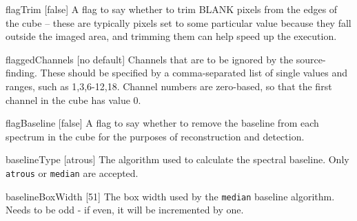 \begin{Lentry}
\item[{flagTrim [false]}] A flag to say whether to trim
  BLANK pixels from the edges of the cube -- these are typically
  pixels set to some particular value because they fall outside the
  imaged area, and trimming them can help speed up the execution.
\item[{flaggedChannels [no default]}] Channels that are to be ignored
  by the source-finding. These should be specified by a
  comma-separated list of single values and ranges, such as
  1,3,6-12,18. Channel numbers are zero-based, so that the first
  channel in the cube has value 0.
\item[{flagBaseline [false]}] A flag to say whether to remove
  the baseline from each spectrum in the cube for the purposes of
  reconstruction and detection.
\item[{baselineType [atrous]}] The algorithm used to calculate the
  spectral baseline. Only \texttt{atrous} or \texttt{median} are
  accepted.
\item[{baselineBoxWidth [51]}] The box width used by the
  \texttt{median} baseline algorithm. Needs to be odd - if even, it
  will be incremented by one.
\end{Lentry}


